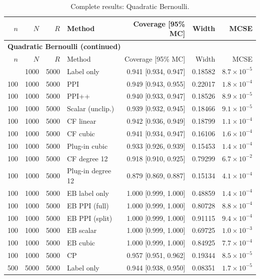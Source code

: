 {\setlength{\tabcolsep}{3pt}\begin{longtable}{rrrlrrr}
\caption{Complete results: Quadratic Bernoulli.}\\
\toprule $n$ & $N$ & $R$ & Method & Coverage [95\% MC] & Width & MCSE \\
\midrule\endfirsthead
\multicolumn{7}{l}{\textbf{Quadratic Bernoulli (continued)}}\\
\toprule $n$ & $N$ & $R$ & Method & Coverage [95\% MC] & Width & MCSE \\
\midrule\endhead
\bottomrule\endfoot
100 & 1000 & 5000 & Label only & 0.941 [0.934, 0.947] & 0.18582 & $8.7\times 10^{-5}$ \\
100 & 1000 & 5000 & PPI & 0.949 [0.943, 0.955] & 0.22017 & $1.8\times 10^{-4}$ \\
100 & 1000 & 5000 & PPI++ & 0.940 [0.933, 0.947] & 0.18526 & $8.9\times 10^{-5}$ \\
100 & 1000 & 5000 & Scalar (unclip.) & 0.939 [0.932, 0.945] & 0.18466 & $9.1\times 10^{-5}$ \\
100 & 1000 & 5000 & CF linear & 0.942 [0.936, 0.949] & 0.18799 & $1.1\times 10^{-4}$ \\
100 & 1000 & 5000 & CF cubic & 0.941 [0.934, 0.947] & 0.16106 & $1.6\times 10^{-4}$ \\
100 & 1000 & 5000 & Plug-in cubic & 0.933 [0.926, 0.939] & 0.15453 & $1.4\times 10^{-4}$ \\
100 & 1000 & 5000 & CF degree 12 & 0.918 [0.910, 0.925] & 0.79299 & $6.7\times 10^{-2}$ \\
100 & 1000 & 5000 & Plug-in degree 12 & 0.879 [0.869, 0.887] & 0.15134 & $4.1\times 10^{-4}$ \\
100 & 1000 & 5000 & EB label only & 1.000 [0.999, 1.000] & 0.48859 & $1.4\times 10^{-4}$ \\
100 & 1000 & 5000 & EB PPI (full) & 1.000 [0.999, 1.000] & 0.80728 & $8.8\times 10^{-4}$ \\
100 & 1000 & 5000 & EB PPI (split) & 1.000 [0.999, 1.000] & 0.91115 & $9.4\times 10^{-4}$ \\
100 & 1000 & 5000 & EB scalar & 1.000 [0.999, 1.000] & 0.69725 & $1.0\times 10^{-3}$ \\
100 & 1000 & 5000 & EB cubic & 1.000 [0.999, 1.000] & 0.84925 & $7.7\times 10^{-4}$ \\
100 & 1000 & 5000 & CP & 0.957 [0.951, 0.962] & 0.19344 & $8.5\times 10^{-5}$ \\
500 & 5000 & 5000 & Label only & 0.944 [0.938, 0.950] & 0.08351 & $1.7\times 10^{-5}$ \\

\end{longtable}}
